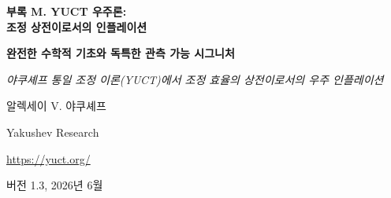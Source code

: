 \documentclass[11pt,a4paper]{article}
\theoremstyle{remark}
\newcommand{\Keff}{K_{\mathrm{eff}}}
\begin{document}
	
	\begin{titlepage}
		\centering
		\vspace*{2cm}
		
		{\Huge\bfseries 부록 M. YUCT 우주론: \\ 조정 상전이로서의 인플레이션\par}
		\vspace{0.5cm}
		{\Large\bfseries 완전한 수학적 기초와 독특한 관측 가능 시그니처\par}
		\vspace{0.3cm}
		{\large\textit{야쿠셰프 통일 조정 이론(YUCT)에서 조정 효율의 상전이로서의 우주 인플레이션}\par}
		
		\vspace{1.5cm}
		
		{\large 알렉세이 V. 야쿠셰프\par}
		\vspace{0.3cm}
		{\normalsize Yakushev Research\par}
		\vspace{0.2cm}
		{\normalsize \url{https://yuct.org/}\par}
		
		\vspace{1.0cm}
		{\normalsize 버전 1.3, 2026년 6월\par}
		
		\vfill
		
		\begin{abstract}
			\noindent
			본 부록에서는 야쿠셰프 통일 조정 이론(YUCT)의 틀에서 우주의 인플레이션 단계를 조정 효율 $\Keff$ 의 상전이로 완전히 수학적으로 기술한다. 초기 우주에서는 $\Keff \ll 1$ 이며 조정장 $\Psi_{MN}$ 이 대칭상에 있음이 보여진다. 냉각에 따라 상전이가 일어나 $\Keff$ 가 $\Keff \gg 1$ 까지 급격히 증가하여 기본 스칼라장(인플라톤)을 도입하지 않고 지수적 팽창(인플레이션)을 생성한다. 유효 퍼텐셜은 19차원 YUCT 라그랑지안에서 유도되며 사전의 프랙탈 구조를 계승한다. 보편적 오차 스케일링 지수 $\beta = 0.67$ (부록 L)은 인플레이션 매개변수 결정에 핵심적인 역할을 한다. 스칼라 스펙트럼 지수 $n_s$ 와 텐서-스칼라 비 $r$ 의 식이 얻어지며, 이들은 플랑크 데이터와 일치하고 미래 실험(CMB‑S4, LiteBIRD, Euclid)에 구체적인 예측을 제공한다. 인플레이션 후, 조정장의 응축체는 입자로 붕괴하여 우주에 물질을 채운다. 이 과정의 효율도 $\beta$ 에 의존하며, 핵합성을 동일한 프랙탈 스케일링과 연결한다. 또한, YUCT 인플레이션을 다른 모델과 구별하는 독특한 관측 가능 시그니처를 특정한다: 고정된 국소 비가우스성 $f_{\text{NL}}^{\text{local}} \approx 1.12$, $f_{\text{NL}}$ 과 $r$ 의 특정 관계, 바이스펙트럼의 특징적 형태, 텐서 파워 스펙트럼에서의 가능한 진동. 인플레이션의 조정적 성질을 검증하기 위한 실험 프로토콜을 제안한다.
		\end{abstract}
		

\end{titlepage}
\end{document}

